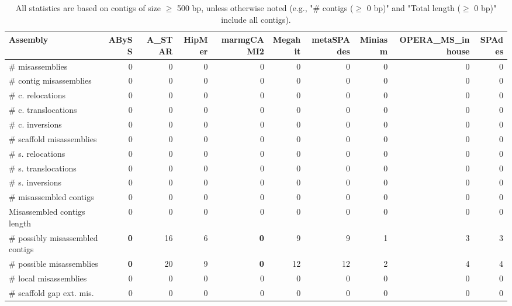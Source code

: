 \documentclass[12pt,a4paper]{article}
\begin{document}
\begin{table}[ht]
\begin{center}
\caption{All statistics are based on contigs of size $\geq$ 500 bp, unless otherwise noted (e.g., "\# contigs ($\geq$ 0 bp)" and "Total length ($\geq$ 0 bp)" include all contigs).}
\begin{tabular}{|l*{9}{|r}|}
\hline
Assembly & ABySS & A\_STAR & HipMer & marmgCAMI2 & Megahit & metaSPAdes & Miniasm & OPERA\_MS\_inhouse & SPAdes \\ \hline
\# misassemblies & 0 & 0 & 0 & 0 & 0 & 0 & 0 & 0 & 0 \\ \hline
\hspace{2mm}\# contig misassemblies & 0 & 0 & 0 & 0 & 0 & 0 & 0 & 0 & 0 \\ \hline
\hspace{5mm}\# c. relocations & 0 & 0 & 0 & 0 & 0 & 0 & 0 & 0 & 0 \\ \hline
\hspace{5mm}\# c. translocations & 0 & 0 & 0 & 0 & 0 & 0 & 0 & 0 & 0 \\ \hline
\hspace{5mm}\# c. inversions & 0 & 0 & 0 & 0 & 0 & 0 & 0 & 0 & 0 \\ \hline
\hspace{2mm}\# scaffold misassemblies & 0 & 0 & 0 & 0 & 0 & 0 & 0 & 0 & 0 \\ \hline
\hspace{5mm}\# s. relocations & 0 & 0 & 0 & 0 & 0 & 0 & 0 & 0 & 0 \\ \hline
\hspace{5mm}\# s. translocations & 0 & 0 & 0 & 0 & 0 & 0 & 0 & 0 & 0 \\ \hline
\hspace{5mm}\# s. inversions & 0 & 0 & 0 & 0 & 0 & 0 & 0 & 0 & 0 \\ \hline
\# misassembled contigs & 0 & 0 & 0 & 0 & 0 & 0 & 0 & 0 & 0 \\ \hline
Misassembled contigs length & 0 & 0 & 0 & 0 & 0 & 0 & 0 & 0 & 0 \\ \hline
\# possibly misassembled contigs & {\bf 0} & 16 & 6 & {\bf 0} & 9 & 9 & 1 & 3 & 3 \\ \hline
\hspace{5mm}\# possible misassemblies & {\bf 0} & 20 & 9 & {\bf 0} & 12 & 12 & 2 & 4 & 4 \\ \hline
\# local misassemblies & 0 & 0 & 0 & 0 & 0 & 0 & 0 & 0 & 0 \\ \hline
\# scaffold gap ext. mis. & 0 & 0 & 0 & 0 & 0 & 0 & 0 & 0 & 0 \\ \hline

\end{tabular}
\end{center}
\end{table}
\end{document}
